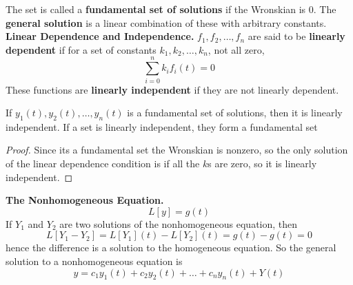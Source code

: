     The set is called a \textbf{fundamental set of solutions} if the Wronskian is 0. The \textbf{general solution} is a linear combination of these with arbitrary constants.
    \newline
    \textbf{Linear Dependence and Independence. } $f_1,f_2,\dots, f_n$ are said to be \textbf{linearly dependent} if for a set of constants $k_1,k_2,\dots,k_n$, not all zero,
    $$\sum_{i=0}^n k_if_i(t) = 0$$
    These functions are \textbf{linearly independent} if they are not linearly dependent.
    \begin{theorem}
        If $y_1(t),y_2(t),\dots,y_n(t)$ is a fundamental set of solutions, then it is linearly independent. If a set is linearly independent, they form a fundamental set
    \end{theorem}
    \begin{proof}
        Since its a fundamental set the Wronskian is nonzero, so the only solution of the linear dependence condition is if all the $k$s are zero, so it is linearly independent.
    \end{proof}
    \textbf{The Nonhomogeneous Equation. }
    $$L[y] = g(t)$$
    If $Y_1$ and $Y_2$ are two solutions of the nonhomogeneous equation, then
    $$L[Y_1 - Y_2] = L[Y_1](t) - L[Y_2](t) = g(t) - g(t) = 0$$
    hence the difference is a solution to the homogeneous equation. 
    \newline \indent
    So the general solution to a nonhomogeneous equation is
    $$y = c_1y_1(t) + c_2y_2(t) + \dots + c_ny_n(t) + Y(t)$$